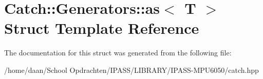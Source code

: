 \hypertarget{structCatch_1_1Generators_1_1as}{}\section{Catch\+:\+:Generators\+:\+:as$<$ T $>$ Struct Template Reference}
\label{structCatch_1_1Generators_1_1as}


The documentation for this struct was generated from the following file\+:\begin{DoxyCompactItemize}
\item 
/home/daan/\+School Opdrachten/\+I\+P\+A\+S\+S/\+L\+I\+B\+R\+A\+R\+Y/\+I\+P\+A\+S\+S-\/\+M\+P\+U6050/catch.\+hpp\end{DoxyCompactItemize}

